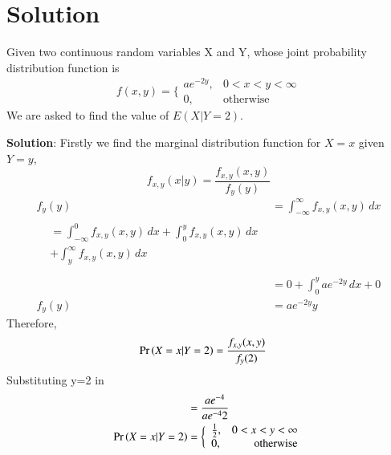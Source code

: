 \documentclass[journal,12pt,twocolumn]{IEEEtran}
\begin{document}
\section{\textbf{Solution}}
\begin{lemma}
Given two continuous random variables X and Y, whose joint probability distribution function is\newline
\begin{equation}
    f(x,y) = \bigg\{ \begin{array}{lr}
    ae^{-2y}, & 0<x<y<\infty  \\
     0, &\text{otherwise} 
\end{array}
\end{equation}
We are asked to find the value of $E(X|Y=2)$.
\end{lemma}
\textbf{Solution}: Firstly we find the marginal distribution function for $X=x$ given $Y=y$,
\begin{equation}
    f_{x,y}(x|y) = \frac{f_{x,y}(x,y)}{f_y(y)}
\end{equation}
\begin{align}
    f_y(y) &= \int_{-\infty}^{\infty} f_{x,y}(x,y) \,dx \\
    \begin{split}
         &= \int_{-\infty}^{0} f_{x,y}(x,y) \,dx + \int_{0}^{y} f_{x,y}(x,y) \,dx \\
        &+ \int_{y}^{\infty} f_{x,y}(x,y) \,dx\\
    \end{split}\\
    &= 0 + \int_0^y ae^{-2y} \,dx + 0 \\
    f_y(y) &= ae^{-2y}y
\end{align}
Therefore,
\begin{align}
    \Pr\left(X=x|Y=2\right) &= \frac{f_{x,y}(x,y)}{f_y(2)}
    \end{align}
Substituting y=2 in 
\begin{align}
     &= \frac{ae^{-4}}{ae^{-4}2} \\
    \Pr\left(X=x|Y=2\right) &= \bigg\{ \begin{array}{lr}
    \frac{1}{2}, & 0<x<y<\infty  \\
     0, &\text{otherwise} 
\end{array}
\end{align}
   
\end{document}
